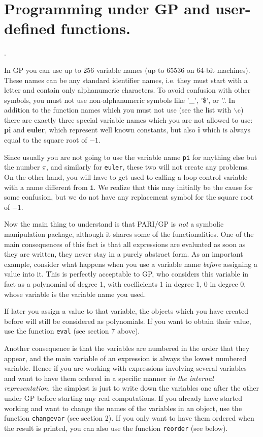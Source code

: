 \section{Programming under GP and user-defined functions.}


.

In GP you can use up to 256 variable names (up to 65536 on 64-bit 
machines). These names can be any standard identifier names, i.e. they 
must start with a letter and contain only alphanumeric characters. To
avoid confusion with other symbols, you must not 
use non-alphanumeric symbols like '\_', '\$', or '.'. In addition to the
function names which you must not use (see the list with $\backslash$c) there
are exactly three special variable names which you are not allowed to use:
{\bf pi} and {\bf euler}, which represent well known constants, but also 
{\bf i} which is always equal to the square root of $-1$.

Since usually you are not going to use the variable name {\tt pi} for anything else but
the number $\pi$, and similarly for {\tt euler}, these two will not create any problems.
On the other hand, you will have to get used to calling a loop control variable
with a name different from {\tt i}. We realize that this may initially be the cause for
some confusion, but we do not have any replacement symbol for the square root of $-1$.

Now the main thing to understand is that PARI/GP is {\sl not} a symbolic manipulation
package, although it shares some of the functionalities. One of the main consequences
of this fact is that all expressions are evaluated as soon as they are written, they
never stay in a purely abstract form. As an important example, consider what happens
when you use a variable name {\sl before} assigning a value into it. This is perfectly
acceptable to GP, who considers this variable in fact as a polynomial of degree 1, with
coefficients 1 in degree 1, 0 in degree 0, whose variable is the variable name you used.

If later you assign a value to that variable, the objects which you have created before
will still be considered as polynomials. If you want to obtain their value, use the
function {\tt eval} (see section 7 above).

Another consequence is that the variables are numbered in the order
that they appear, and the main variable of an expression is always
the lowest numbered variable. Hence if you are working with expressions
involving several variables and want to have them ordered in a specific manner
{\sl in the internal representation}, the simplest is just to write down the variables
one after the other under GP before starting any real computations.
If you already have started working and want to change the names of the variables
in an object, use the function {\tt changevar} (see section 2). If you only want
to have them ordered when the result is printed, you can also use the function
{\tt reorder} (see below).

